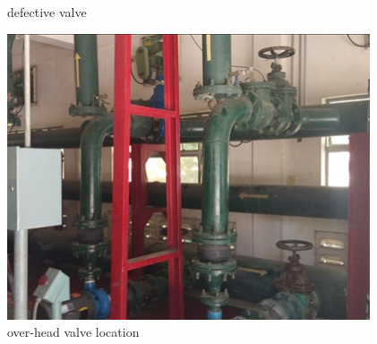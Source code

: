 \begin{figure}[!htb]
\begin{minipage}[b]{0.3\linewidth}
		\caption{defective valve}
		\label{fig_ch043_valve1A}
	\end{minipage}
	\hspace{0.05cm}
	\begin{minipage}[b]{0.3\linewidth}
		\centering
		\includegraphics[width=\textwidth]{figures/fig_ch043_valvesabovehead}
		\caption{over-head valve location}
		\label{fig_ch043_valvesabovehead}
	\end{minipage}
\end{figure}

